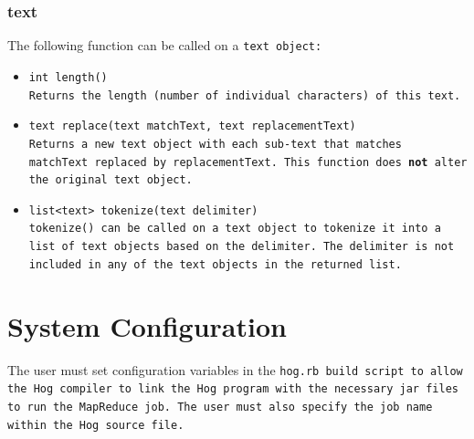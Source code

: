 \documentclass{article}
\begin{document}

\subsubsection{text} %
\label{ssub:text}

The following function can be called on a \tt text \rm object:

\begin{itemize}

\item[] \tt int length() \rm \\

Returns the length (number of individual characters) of this \tt text\rm.

\item[] \tt text replace(text matchText, text replacementText) \rm \\

Returns a new \tt text \rm object with each sub-\tt text \rm that matches \tt
matchText \rm replaced by \tt replacementText\rm. This function does \textbf{not}
alter the original \tt text \rm object.

\item[] \tt list<text> tokenize(text delimiter) \rm \\

\tt tokenize() \rm can be called on a \tt text \rm object to tokenize it into a
list of \tt text \rm objects based on the delimiter. The delimiter is not included
in any of the \tt text \rm objects in the returned list.

\end{itemize}




\section{System Configuration} %
\label{sec:system_configuration}

The user must set configuration variables in the \tt hog.rb \rm build script to
allow the Hog compiler to link the Hog program with the necessary jar files to run
the MapReduce job. The user must also specify the job name within the Hog source
file.
\end{document}
